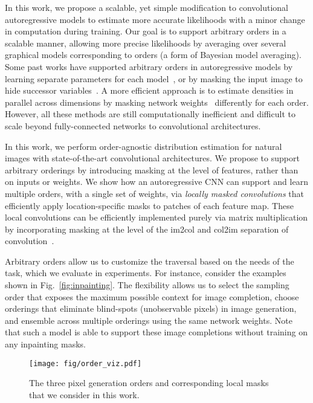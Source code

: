 \documentclass[letterpaper]{article}
\begin{document}
In this work, we propose a scalable, yet simple modification to convolutional autoregressive models to estimate more accurate likelihoods with a minor change in computation during training. 
Our goal is to support arbitrary orders in a scalable manner, allowing more precise likelihoods by averaging over several graphical models corresponding to orders (a form of Bayesian model averaging). Some past works have supported arbitrary orders in autoregressive models by learning separate parameters for each model~\citep{frey1998graphical}, or by masking the input image to hide successor variables~\citep{larochelle2011neural}. A more efficient approach is to estimate densities in parallel across dimensions by masking network weights~\citep{germain2015made} differently for each order. However, all these methods are still computationally inefficient and difficult to scale beyond fully-connected networks to convolutional architectures.

In this work, we perform order-agnostic distribution estimation for natural images with state-of-the-art convolutional architectures.
We propose to support arbitrary orderings by introducing masking at the level of features, rather than on inputs or weights. 
We show how an autoregressive CNN can support and learn multiple orders, with a single set of weights, via \textit{locally masked convolutions} that efficiently apply location-specific masks to patches of each feature map. 
These local convolutions can be efficiently implemented purely via matrix multiplication by incorporating masking at the level of the im2col and col2im separation of convolution~\citep{jia2014caffe}. 

Arbitrary orders allow us to customize the traversal based on the needs of the task, which we evaluate in experiments. For instance, consider the examples shown in Fig.~\ref{fig:inpainting}. The flexibility allows us to select the sampling order that exposes the maximum possible context for image completion, choose orderings that eliminate blind-spots (unobservable pixels) in image generation, and ensemble across multiple orderings using the same network weights. Note that such a model is able to support these image completions without training on any inpainting masks.

\begin{figure}[t]
    \centering
    \texttt{[image: fig/order\_viz.pdf]}
    \vspace{-4mm}
    \caption{The three pixel generation orders and corresponding local masks that we consider in this work.}
    \label{fig:orders_viz}
\end{figure}
\end{document}
